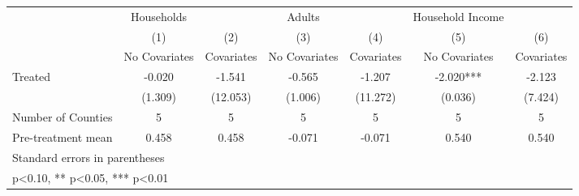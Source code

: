 {
\def\sym#1{\ifmmode^{#1}\else\(^{#1}\)\fi}
\begin{tabular}{l*{6}{c}}
\hline\hline
            &  Households   &               &      Adults   &               &Household Income   &               \\
            &\multicolumn{1}{c}{(1)}&\multicolumn{1}{c}{(2)}&\multicolumn{1}{c}{(3)}&\multicolumn{1}{c}{(4)}&\multicolumn{1}{c}{(5)}&\multicolumn{1}{c}{(6)}\\
            &\multicolumn{1}{c}{No Covariates}&\multicolumn{1}{c}{Covariates}&\multicolumn{1}{c}{No Covariates}&\multicolumn{1}{c}{Covariates}&\multicolumn{1}{c}{No Covariates}&\multicolumn{1}{c}{Covariates}\\
\hline
Treated     &      -0.020   &      -1.541   &      -0.565   &      -1.207   &      -2.020***&      -2.123   \\
            &     (1.309)   &    (12.053)   &     (1.006)   &    (11.272)   &     (0.036)   &     (7.424)   \\
\hline
Number of Counties&           5   &           5   &           5   &           5   &           5   &           5   \\
Pre-treatment mean&       0.458   &       0.458   &      -0.071   &      -0.071   &       0.540   &       0.540   \\
\hline\hline
\multicolumn{7}{l}{\footnotesize Standard errors in parentheses}\\
\multicolumn{7}{l}{\footnotesize * p<0.10, ** p<0.05, *** p<0.01}\\
\end{tabular}
}
